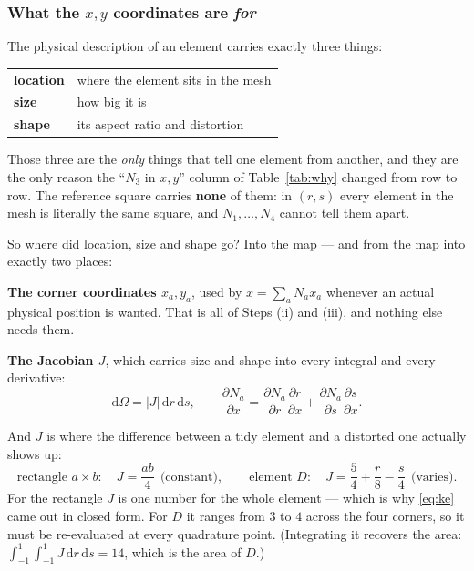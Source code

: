 \documentclass[11pt]{article}
\begin{document}
\subsubsection*{What the $x,y$ coordinates are \emph{for}}

The physical description of an element carries exactly three things:

\begin{center}\small
\renewcommand{\arraystretch}{1.25}
\begin{tabular}{@{}ll@{}}
\toprule
\textbf{location} & where the element sits in the mesh\\
\textbf{size} & how big it is\\
\textbf{shape} & its aspect ratio and distortion\\
\bottomrule
\end{tabular}
\end{center}

\noindent
Those three are the \emph{only} things that tell one element from another, and
they are the only reason the ``$N_{3}$ in $x,y$'' column of
Table~\ref{tab:why} changed from row to row. The reference square carries
\textbf{none} of them: in $(r,s)$ every element in the mesh is literally the
same square, and $N_{1},\dots,N_{4}$ cannot tell them apart.

\medskip
So where did location, size and shape go? Into the map --- and from the map
into exactly two places:

\begin{steps}
\item \textbf{The corner coordinates $x_{a},y_{a}$}, used by
      $x=\sum_{a}N_{a}x_{a}$ whenever an actual physical position is wanted.
      That is all of Steps (ii) and (iii), and nothing else needs them.
\item \textbf{The Jacobian $J$}, which carries size and shape into every
      integral and every derivative:
\begin{equation}\label{eq:jac}
  \mathrm{d}\Omega=|J|\,\mathrm{d}r\,\mathrm{d}s,
  \qquad
  \frac{\partial N_{a}}{\partial x}
   =\frac{\partial N_{a}}{\partial r}\frac{\partial r}{\partial x}
   +\frac{\partial N_{a}}{\partial s}\frac{\partial s}{\partial x} .
\end{equation}
\end{steps}

\noindent
And $J$ is where the difference between a tidy element and a distorted one
actually shows up:
\begin{equation}\label{eq:jacvals}
  \text{rectangle } a\times b:\quad J=\frac{ab}{4}\ \ \text{(constant)},
  \qquad
  \text{element } D:\quad J=\frac54+\frac{r}{8}-\frac{s}{4}\ \ \text{(varies)} .
\end{equation}
For the rectangle $J$ is one number for the whole element --- which is why
\eqref{eq:ke} came out in closed form. For $D$ it ranges from $3$ to
$4$ across the four corners, so it must be re-evaluated at every quadrature
point. (Integrating it recovers the area: $\int_{-1}^{1}\!\int_{-1}^{1}J\,
\mathrm{d}r\,\mathrm{d}s=14$, which is the area of $D$.)
\end{document}
